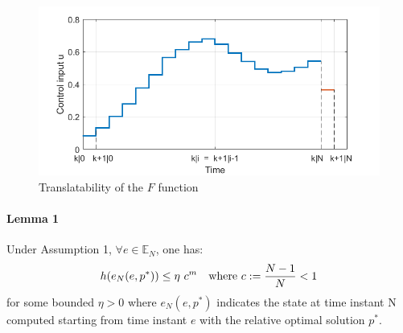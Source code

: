 \begin{figure}[h!]
	\centering
	\includegraphics[scale=0.6]{IMMAGINI/trans_u.png}
	\caption{Translatability of the $F$ function}
	\label{param_translatability}
\end{figure}

\paragraph{Lemma 1} Under Assumption 1, $\forall e \in \mathbb{E}_N$, one has:
\begin{equation}
	h(e_N(e,p^*)) \leq \eta\ c^m\ \ \  \textnormal{where    } c:=\frac{N-1}{N} < 1
 	\label{lemma1}
\end{equation}
for some bounded $\eta > 0$ where $e_N(e,p^*)$ indicates the state at time instant N computed starting from time instant $e$ with the relative optimal solution $p^*$. \\

